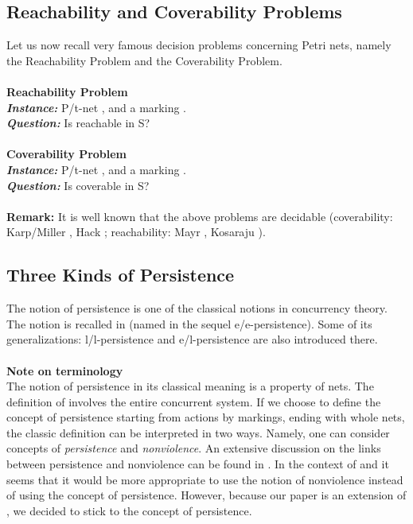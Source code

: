 \documentclass[a4paper]{llncs}
\begin{document}
\subsection{Reachability and Coverability Problems}


Let us now recall very famous decision problems concerning Petri nets, namely the Reachability Problem and the Coverability Problem.
\\ \\
\textbf{Reachability Problem}
\\
\indent\textbf{\emph{Instance:}} P/t-net , and a marking .\\
\indent\textbf{\emph{Question:}} Is  reachable in S?
\\ \\
\textbf{Coverability Problem}
\\
\indent\textbf{\emph{Instance:}} P/t-net , and a marking .\\
\indent\textbf{\emph{Question:}} Is  coverable in S?
\\ \\
\textbf{Remark:} It is well known that the above problems are decidable (coverability: Karp/Miller \cite{KarpMiller}, Hack \cite{Hack}; reachability: Mayr \cite{Mayr}, Kosaraju \cite{Kosaraju}). 


\subsection{Three Kinds of Persistence}


The notion of persistence is one of the classical notions in concurrency theory. The notion is recalled in \cite{BarOch} (named in the sequel e/e-persistence). Some of its generalizations: l/l-persistence and e/l-persistence are also introduced there.
\\ \\
\textbf{Note on terminology}\\
The notion of persistence in its classical meaning is a property of nets. The definition of \cite{LandRob} involves the entire concurrent system. 
If we choose to define the concept of persistence starting from actions by markings, ending with whole nets, the classic definition can be interpreted in two ways. Namely, one can consider concepts of \emph{persistence} and \emph{nonviolence}. An extensive discussion on the links between persistence and nonviolence can be found in \cite{Koutny}. In the context of \cite{BarMikOch} and  \cite{Koutny} it seems that it would be more appropriate to use the notion of nonviolence instead of using the concept of persistence. However, because our paper is an extension of \cite{BarOch}, we decided to stick to the concept of persistence.
\end{document}

